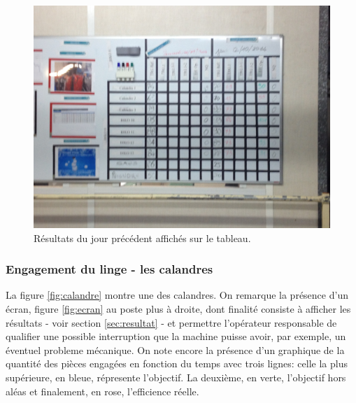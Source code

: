 \documentclass{article}
\newcommand{\rapportFigure}{0.075}
\begin{document}
\FloatBarrier

%
\begin{figure}[h]
    \centering
    \includegraphics[scale= \rapportFigure]{images/quadre_jour}
    \caption{Résultats du jour précédent affichés sur le tableau.}
    \label{fig:tableau}
\end{figure}
%
\FloatBarrier

\subsubsection{Engagement du linge - les calandres}

La figure \ref{fig:calandre} montre une des calandres. On remarque la présence
d'un écran, figure \ref{fig:ecran} au poste plus à droite, dont finalité
consiste à afficher les résultats - voir section \ref{sec:resultat} - et
permettre l'opérateur responsable de qualifier une possible interruption que la
machine puisse avoir, par exemple, un éventuel probleme mécanique. On note
encore la présence d'un graphique de la quantité des pièces engagées en
fonction du temps avec trois lignes: celle la plus supérieure, en bleue,
répresente l'objectif. La deuxième, en verte, l'objectif hors aléas et
finalement, en rose, l'efficience réelle.
\end{document}
